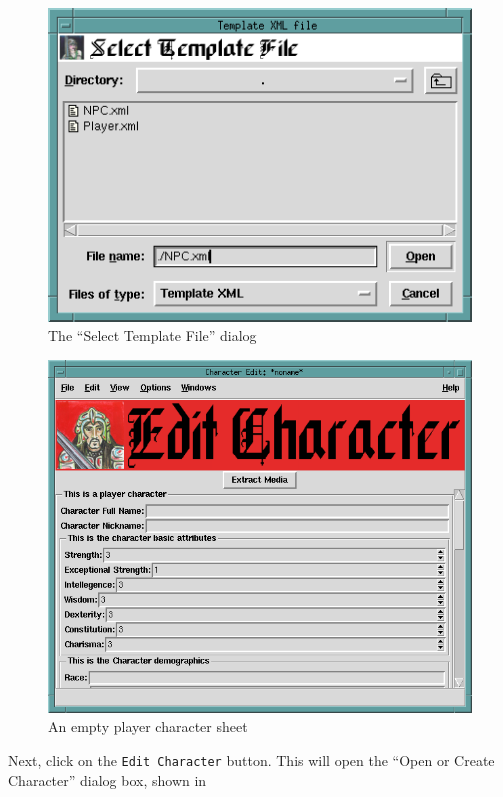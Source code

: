 \begin{figure}[hbpt]  
\begin{centering}
\includegraphics{SelectTemplateFile.png} 
\caption{The ``Select Template File'' dialog} 
\label{fig:selecttemplatefile} 
\end{centering}
\end{figure} 
\begin{figure}[hbpt] 
\begin{centering}
\includegraphics[width=5in]{EmptyPlayerCharacterSheet.png} 
\caption{An empty player character sheet} 
\label{fig:emptyplayercharacter}
\end{centering} 
\end{figure} 
Next, click on the \verb=Edit Character= button.  This will open the
``Open or Create Character'' dialog box, shown in

